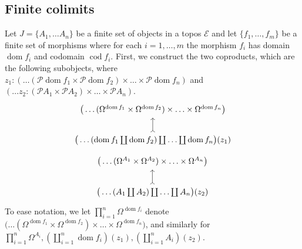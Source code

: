 \documentclass{birkjour}
\theoremstyle{plain}
\theoremstyle{definition}
\newcommand{\call}[1]{\mathcal{#1}}
\begin{document}
	\subsection{Finite colimits}\label{sec:colimits}
	Let $J = \lbrace A_1,\hdots A_n\rbrace$ be a finite set of objects in a topos $\call{E}$ and let $\lbrace f_1,\hdots, f_m\rbrace$ be a finite set of morphisms where for each $i=1,\hdots, m$ the morphism $f_i$ has domain $\operatorname{dom}f_i$ and codomain $\operatorname{cod}f_i$.
	First, we construct the two coproducts, which are the following subobjects, where $z_1 : (\hdots(\call{P} \operatorname{dom}f_1 \times \call{P} \operatorname{dom}f_2) \times \hdots \times \call{P} \operatorname{dom}f_n)$ and $( \hdots z_2 : (\call{P} A_1 \times \call{P} A_2 ) \times \hdots \times \call{P}A_n)$.
	\begin{equation}
		\begin{tikzcd}
			\big(\hdots (\Omega^{\operatorname{dom}f_1} \times \Omega^{\operatorname{dom}f_2}) \times \hdots \times \Omega^{\operatorname{dom}f_n}\big)\\
			\big( \hdots ( \operatorname{dom}f_1 \coprod \operatorname{dom}f_2) \coprod \hdots \coprod \operatorname{dom}f_n\big)(z_1)\arrow[u,rightarrowtail]
		\end{tikzcd}
	\end{equation}
	\begin{equation}
		\begin{tikzcd}
			\big(\hdots (\Omega^{A_1} \times \Omega^{A_2}) \times \hdots \times \Omega^{A_n}\big)\\
			\big( \hdots ( A_1 \coprod A_2) \coprod \hdots \coprod A_n\big)(z_2)\arrow[u,rightarrowtail]
		\end{tikzcd}
	\end{equation}
	To ease notation, we let $\prod_{i = 1}^n \Omega^{\operatorname{dom}f_i}$ denote $\big(\hdots (\Omega^{\operatorname{dom}f_1} \times \Omega^{\operatorname{dom}f_2}) \times \hdots \times \Omega^{\operatorname{dom}f_n}\big)$, and similarly for $\prod_{i = 1}^n\Omega^{A_i}, (\coprod_{i = 1}^n \operatorname{dom}f_i)(z_1), (\coprod_{i = 1}^n A_i)(z_2)$.
	
\end{document}
